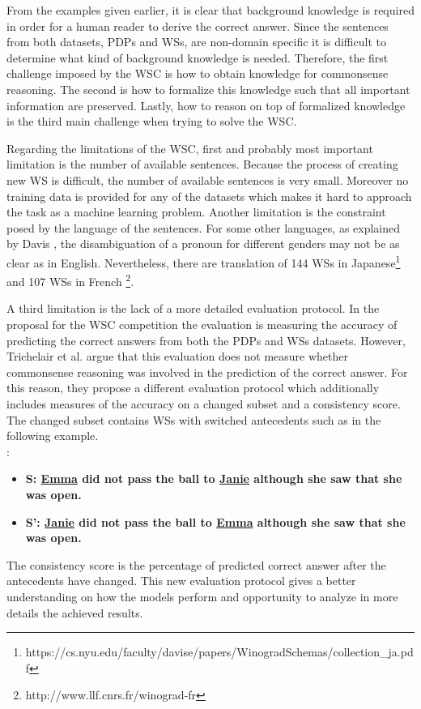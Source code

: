 From the examples given earlier, it is clear that background knowledge is required in order for a human reader to derive the correct answer. Since the sentences from both datasets, PDPs and WSs, are non-domain specific it is difficult to determine what kind of background knowledge is needed. Therefore, the first challenge imposed by the WSC is how to obtain knowledge for commonsense reasoning. 
The second is how to formalize this knowledge such that all important information are preserved. Lastly, how to reason on top of formalized knowledge is the third main challenge when trying to solve the WSC. 

Regarding the limitations of the WSC, first and probably most important limitation is the number of available sentences. Because the process of creating new WS is difficult, the number of available sentences is very small. Moreover no training data is provided for any of the datasets which makes it hard to approach the task as a machine learning problem. Another limitation is the constraint posed by the language of the sentences. For some other languages, as explained by Davis \cite{DBLP:journals/corr/Davis16}, the disambiguation of a pronoun for different genders may not be as clear as in English. Nevertheless, there are translation of 144 WSs in Japanese\footnote{https://cs.nyu.edu/faculty/davise/papers/WinogradSchemas/collection\_ja.pdf} and 107 WSs in French \footnote{http://www.llf.cnrs.fr/winograd-fr}. 

A third limitation is the lack of a more detailed evaluation protocol. In the proposal for the WSC competition the evaluation is measuring the accuracy of predicting the correct answers from both the PDPs and WSs datasets. However, Trichelair et al. \cite{DBLP:journals/corr/abs-1811-01778} argue that this evaluation does not measure whether commonsense reasoning was involved in the prediction of the correct answer. For this reason, they propose a different evaluation protocol which additionally includes measures of the accuracy on a changed subset and a consistency score. The changed subset contains WSs with switched antecedents such as in the following example. \\
:
\begin{itemize} 
	\item \textbf{S: \underline{Emma} did not pass the ball to \underline{Janie} although she saw that she was open.}
		\item \textbf{S': \underline{Janie} did not pass the ball to \underline{Emma} although she saw that she was open.} 
\end{itemize}

The consistency score is the percentage of predicted correct answer after the antecedents have changed. This new evaluation protocol gives a better understanding on how the models perform and opportunity to analyze in more details the achieved results.

 


